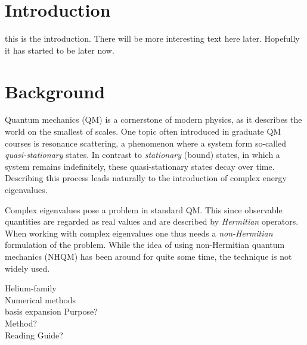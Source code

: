 \documentclass[12pt,a4paper]{article}
\begin{document}
\section{Introduction}
this is the introduction. There will be more interesting text here later. Hopefully it has started to be later now.

\section{Background}
Quantum mechanics (QM) is a cornerstone of modern physics, as it describes the world on the smallest of scales.
One topic often introduced in graduate QM courses is resonance scattering, a phenomenon where a system form so-called \emph{quasi-stationary} states.
In contrast to \emph{stationary} (bound) states, in which a system remains indefinitely, these quasi-stationary states decay over time.
Describing this process leads naturally to the introduction of complex energy eigenvalues. 

Complex eigenvalues pose a problem in standard QM.
This since observable quantities are regarded as real values and are described by \emph{Hermitian} operators.
When working with complex eigenvalues one thus needs a \emph{non-Hermitian} formulation of the problem.
While the idea of using non-Hermitian quantum mechanics (NHQM) has been around for quite some time, the technique is not widely used.


{\Large Helium-family \\ Numerical methods\\ basis expansion}
{\Large Purpose? \\ Method? \\ Reading Guide?}
\end{document}
